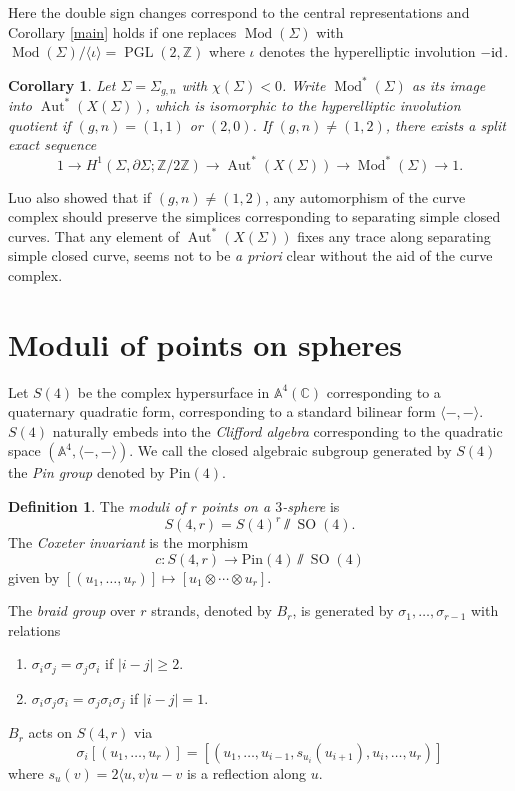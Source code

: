\documentclass[11pt]{amsart}
\numberwithin{theorem}{section}
\newtheorem{corollary}[theorem]{Corollary}
\theoremstyle{definition}
\newtheorem{definition}[theorem]{Definition}
\theoremstyle{remark}
\newcommand{\A}{{\mathbb{A}}}
\newcommand{\C}{{\mathbb{C}}}
\newcommand{\Z}{{\mathbb{Z}}}
\newcommand{\id}{{\textup{id}}}
\DeclareMathOperator{\Aut}{Aut}
\DeclareMathOperator{\Mod}{Mod}
\DeclareMathOperator{\PGL}{PGL}
\DeclareMathOperator{\SO}{SO}
\newcommand{\<}{\langle}
\renewcommand{\>}{\rangle}
\begin{document}
Here the double sign changes correspond to the central representations and Corollary \ref{main} holds if one replaces $\Mod(\Sigma)$ with $\Mod(\Sigma) / \langle \iota \rangle = \PGL(2, \Z)$ where $\iota$ denotes the hyperelliptic involution $-\id$.


\begin{corollary}
    Let $\Sigma = \Sigma_{g,n}$ with $\chi(\Sigma) < 0$. Write $\Mod^*(\Sigma)$ as its image into $\Aut^*(X(\Sigma))$, which is isomorphic to the hyperelliptic involution quotient if $(g, n) = (1, 1)$ or $(2, 0)$. If $(g, n) \neq (1, 2)$, there exists a split exact sequence
    \[
    1 \rightarrow H^1(\Sigma, \partial \Sigma ; \Z / 2\Z) \rightarrow \Aut^*(X(\Sigma)) \rightarrow \Mod^*(\Sigma) \rightarrow 1.
    \]
\end{corollary}

Luo also showed that if $(g, n) \neq (1, 2)$, any automorphism of the curve complex should preserve the simplices corresponding to separating simple closed curves. That any element of $\Aut^*(X(\Sigma))$ fixes any trace along separating simple closed curve, seems not to be \textit{a priori} clear without the aid of the curve complex. 

\section{Moduli of points on spheres}\label{section4}

Let $S(4)$ be the complex hypersurface in $\A^4(\C)$ corresponding to a quaternary quadratic form, corresponding to a standard bilinear form $\langle -, - \rangle$. $S(4)$ naturally embeds into the \textit{Clifford algebra} corresponding to the quadratic space $(\A^4, \langle-, - \rangle)$. We call the closed algebraic subgroup generated by $S(4)$ the \textit{Pin group} denoted by $\mathrm{Pin}(4)$.

\begin{definition}
    The \textit{moduli of $r$ points on a $3$-sphere} is
    \[
    S(4, r) = S(4)^r \sslash \SO(4).
    \]
    The \textit{Coxeter invariant} is the morphism
    \[
    c : S(4, r) \rightarrow \mathrm{Pin}(4) \sslash \SO(4)
    \]
    given by $[(u_1, \ldots, u_r)] \mapsto [u_1 \otimes \cdots \otimes u_r]$.
\end{definition}

The \textit{braid group} over $r$ strands, denoted by $B_r$, is generated by $\sigma_1, \ldots, \sigma_{r-1}$ with relations
\begin{enumerate}
    \item $\sigma_i \sigma_j = \sigma_j \sigma_i$ if $|i - j| \geq 2$.
    \item $\sigma_i \sigma_j \sigma_i = \sigma_j \sigma_i \sigma_j$ if $|i - j| = 1$.
\end{enumerate}
$B_r$ acts on $S(4, r)$ via
\[
\sigma_i [(u_1, \ldots, u_r)] = [(u_1, \ldots, u_{i-1}, s_{u_i}(u_{i+1}), u_i, \ldots, u_r)]
\]
where $s_u(v) = 2\langle u, v \rangle u - v$ is a reflection along $u$.
\end{document}
